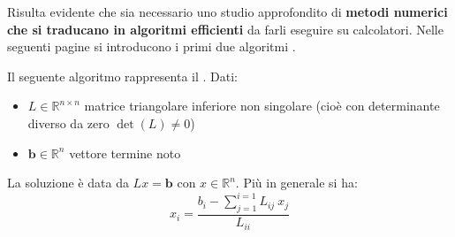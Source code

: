 \highspace
Risulta evidente che sia necessario uno studio approfondito di \textbf{metodi numerici che si traducano in algoritmi efficienti} da farli eseguire su calcolatori. Nelle seguenti pagine si introducono i primi due algoritmi .

\newpage

\begin{definitionbox}\label{metodo delle sostituzioni in avanti}
    Il seguente algoritmo rappresenta il . Dati:
    \begin{itemize}
        \item $L \in \mathbb{R}^{n \times n}$ matrice triangolare inferiore non singolare (cioè con determinante diverso da zero $\det\left(L\right) \ne 0$)
        
        \item $\mathbf{b} \in \mathbb{R}^{n}$ vettore termine noto
    \end{itemize}
    La soluzione è data da $Lx = \mathbf{b}$ con $x \in \mathbb{R}^{n}$. Più in generale si ha:
    \begin{equation}\label{eq: metodo delle sostituzioni in avanti}
        x_{i} = \dfrac{
            b_{i} - \displaystyle\sum_{j=1}^{i=1} L_{ij} \: x_{j}
        }{
            L_{ii}
        }
    \end{equation}
\end{definitionbox}

